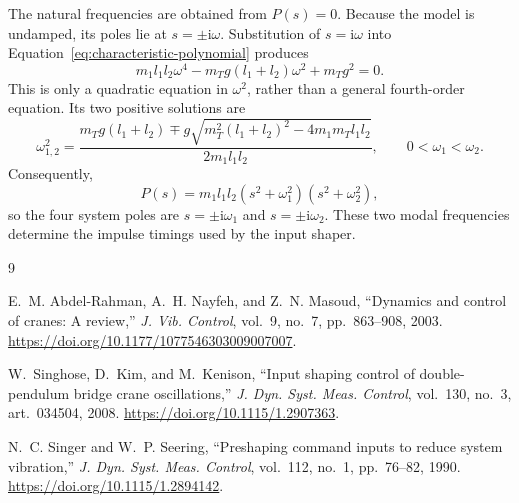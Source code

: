 \documentclass[a4paper,11pt]{article}
\begin{document}
The natural frequencies are obtained from \(P(s)=0\). Because the model is
undamped, its poles lie at \(s=\pm\mathrm i\omega\). Substitution of
\(s=\mathrm i\omega\) into Equation~\eqref{eq:characteristic-polynomial}
produces
\begin{equation}
    m_1l_1l_2\omega^4
    -m_Tg(l_1+l_2)\omega^2
    +m_Tg^2=0.
    \label{eq:frequency-biquadratic}
\end{equation}
This is only a quadratic equation in \(\omega^2\), rather than a general
fourth-order equation. Its two positive solutions are
\begin{equation}
    \omega_{1,2}^2=
    \frac{
        m_Tg(l_1+l_2)
        \mp g\sqrt{m_T^2(l_1+l_2)^2-4m_1m_Tl_1l_2}
    }{
        2m_1l_1l_2
    },
    \qquad 0<\omega_1<\omega_2.
    \label{eq:natural-frequencies}
\end{equation}
Consequently,
\begin{equation}
    P(s)=m_1l_1l_2
    (s^2+\omega_1^2)(s^2+\omega_2^2),
    \label{eq:modal-factorisation}
\end{equation}
so the four system poles are
\(s=\pm\mathrm i\omega_1\) and \(s=\pm\mathrm i\omega_2\). These two modal
frequencies determine the impulse timings used by the input shaper.

{\footnotesize
\begin{thebibliography}{9}
\setlength{\itemsep}{0pt}

E.~M. Abdel-Rahman, A.~H. Nayfeh, and Z.~N. Masoud,
``Dynamics and control of cranes: A review,''
\emph{J. Vib. Control}, vol.~9, no.~7, pp.~863--908, 2003.
\url{https://doi.org/10.1177/1077546303009007007}.

W.~Singhose, D.~Kim, and M.~Kenison,
``Input shaping control of double-pendulum bridge crane oscillations,''
\emph{J. Dyn. Syst. Meas. Control}, vol.~130, no.~3, art.~034504, 2008.
\url{https://doi.org/10.1115/1.2907363}.

N.~C. Singer and W.~P. Seering,
``Preshaping command inputs to reduce system vibration,''
\emph{J. Dyn. Syst. Meas. Control}, vol.~112, no.~1, pp.~76--82, 1990.
\url{https://doi.org/10.1115/1.2894142}.

\end{thebibliography}
}
\end{document}
